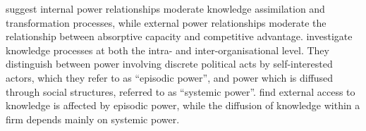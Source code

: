 
\citet{todorova2007absorptive} suggest internal power relationships moderate knowledge assimilation and transformation processes, while external power relationships moderate the relationship between absorptive capacity and competitive advantage. \citet{easterby2008absorptive} investigate knowledge processes at both the intra- and inter-organisational level. They distinguish between power involving discrete political acts by self-interested actors, which they refer to as \enquote{episodic power}, and power which is diffused through social structures, referred to as \enquote{systemic power}. \citet{easterby2008absorptive} find external access to knowledge is affected by episodic power, while the diffusion of knowledge within a firm depends mainly on systemic power. \medskip



